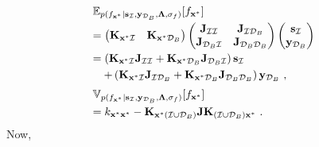 \documentclass[conference]{IEEEtran}
\begin{document}
	\begin{equation*}
		\hspace{-1.7mm}
		\begin{array}{l}
			\displaystyle\mathbb{E}_{p(f_{\mathbf{x}^*}|\mathbf{s}_\mathcal{I},\mathbf{y}_{\mathcal{D}_B},\mathbf{\Lambda},\sigma_f)}[f_{\mathbf{x}^*}] \vspace{1mm}\\
			=\begin{pmatrix}
				\mathbf{K}_{\mathbf{x}^*\mathcal{I}} & \mathbf{K}_{\mathbf{x}^*\mathcal{D}_B}
			\end{pmatrix}
			\begin{pmatrix}
				\mathbf{J}_{\mathcal{I}\mathcal{I}} & \mathbf{J}_{\mathcal{I}\mathcal{D}_B} \\
				\mathbf{J}_{\mathcal{D}_B\mathcal{I}} & \mathbf{J}_{\mathcal{D}_B\mathcal{D}_B}
			\end{pmatrix}
			\begin{pmatrix}
				\mathbf{s}_\mathcal{I} \\
				\mathbf{y}_{\mathcal{D}_B}
			\end{pmatrix} \vspace{1mm}\\
			\displaystyle=\left(\mathbf{K}_{\mathbf{x}^*\mathcal{I}}\mathbf{J}_{\mathcal{I}\mathcal{I}}+\mathbf{K}_{\mathbf{x}^*\mathcal{D}_B}\mathbf{J}_{\mathcal{D}_B\mathcal{I}}\right)\mathbf{s}_\mathcal{I}\vspace{1mm}\\
			\displaystyle\quad+\left(\mathbf{K}_{\mathbf{x}^*\mathcal{I}}\mathbf{J}_{\mathcal{I}\mathcal{D}_B}+\mathbf{K}_{\mathbf{x}^*\mathcal{D}_B}\mathbf{J}_{\mathcal{D}_B\mathcal{D}_B}\right)\mathbf{y}_{\mathcal{D}_B}\ ,\vspace{2mm}\\
			\displaystyle\mathbb{V}_{p(f_{\mathbf{x}^*}|\mathbf{s}_\mathcal{I},\mathbf{y}_{\mathcal{D}_B},\mathbf{\Lambda},\sigma_f)}[f_{\mathbf{x}^*}] \vspace{1mm}\\
			=k_{\mathbf{x}^*\mathbf{x}^*}-
			\mathbf{K}_{\mathbf{x}^*(\mathcal{I}\cup\mathcal{D}_B)} 
			\mathbf{J}
			\mathbf{K}_{(\mathcal{I}\cup\mathcal{D}_B)\mathbf{x}^*}\ .
		\end{array}
	\end{equation*}
	Now,
\end{document}
